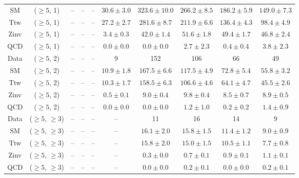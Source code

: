 \begin{table}[h!]
{\begin{tabular}{cccccccccc}
	SM & ($\ge5$, 1) & -- & -- & -- & $30.6\pm 3.0$ & $323.6\pm 10.0$ & $266.2\pm 8.5$ & $186.2\pm 5.9$ & $149.0\pm 7.3$ \\[0.5ex] 
	Ttw & ($\ge5$, 1) & -- & -- & -- & $27.2\pm 2.7$ & $281.6\pm 8.7$ & $211.9\pm 6.6$ & $136.4\pm 4.3$ & $98.4\pm 4.9$ \\[0.5ex] 
	Zinv & ($\ge5$, 1) & -- & -- & -- & $3.4\pm 0.3$ & $42.0\pm 1.4$ & $51.6\pm 1.8$ & $49.4\pm 1.7$ & $46.8\pm 2.4$ \\[0.5ex] 
	QCD & ($\ge5$, 1) & -- & -- & -- & $0.0\pm 0.0$ & $0.0\pm 0.0$ & $2.7\pm 2.3$ & $0.4\pm 0.4$ & $3.8\pm 2.3$ \\[0.5ex] 
	Data & ($\ge5$, 2) & -- & -- & -- & 9 & 152 & 106 & 66 & 49 \\[0.5ex] 
	SM & ($\ge5$, 2) & -- & -- & -- & $10.9\pm 1.8$ & $167.5\pm 6.6$ & $117.5\pm 4.9$ & $72.8\pm 5.4$ & $55.8\pm 3.2$ \\[0.5ex] 
	Ttw & ($\ge5$, 2) & -- & -- & -- & $10.3\pm 1.7$ & $158.5\pm 6.3$ & $106.6\pm 4.6$ & $64.1\pm 4.7$ & $45.5\pm 2.6$ \\[0.5ex] 
	Zinv & ($\ge5$, 2) & -- & -- & -- & $0.5\pm 0.1$ & $9.0\pm 0.4$ & $9.8\pm 0.4$ & $8.5\pm 0.7$ & $8.9\pm 0.5$ \\[0.5ex] 
	QCD & ($\ge5$, 2) & -- & -- & -- & $0.0\pm 0.0$ & $0.0\pm 0.0$ & $1.2\pm 1.0$ & $0.2\pm 0.2$ & $1.4\pm 0.9$ \\[0.5ex] 
	Data & ($\ge5$, $\ge3$) & -- & -- & -- & -- & 11 & 16 & 14 & 9 \\[0.5ex] 
	SM & ($\ge5$, $\ge3$) & -- & -- & -- & -- & $16.1\pm 2.0$ & $15.8\pm 1.5$ & $11.4\pm 1.2$ & $9.0\pm 0.9$ \\[0.5ex] 
	Ttw & ($\ge5$, $\ge3$) & -- & -- & -- & -- & $15.8\pm 2.0$ & $15.0\pm 1.5$ & $10.5\pm 1.1$ & $7.7\pm 0.8$ \\[0.5ex] 
	Zinv & ($\ge5$, $\ge3$) & -- & -- & -- & -- & $0.3\pm 0.0$ & $0.7\pm 0.1$ & $0.9\pm 0.1$ & $1.1\pm 0.1$ \\[0.5ex] 
	QCD & ($\ge5$, $\ge3$) & -- & -- & -- & -- & $0.0\pm 0.0$ & $0.2\pm 0.1$ & $0.0\pm 0.0$ & $0.2\pm 0.1$ \\[0.5ex] 
	\hline
	\hline
\end{tabular}}
\end{table}

